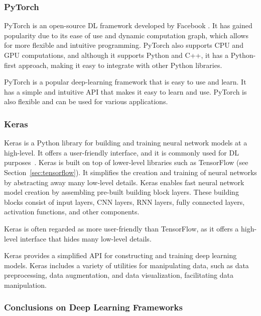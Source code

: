 \subsubsection{PyTorch} \label{sec:pytorch}

PyTorch is an open-source \ac{DL} framework developed by Facebook \cite{paszke_pytorch_2019}. It has gained popularity due to its ease of use and dynamic computation graph, which allows for more flexible and intuitive programming. PyTorch also supports \ac{CPU} and \ac{GPU} computations, and although it supports Python and C++, it has a Python-first approach, making it easy to integrate with other Python libraries.

PyTorch is a popular deep-learning framework that is easy to use and learn. It has a simple and intuitive \ac{API} that makes it easy to learn and use. PyTorch is also flexible and can be used for various applications.

\subsubsection{Keras} \label{sec:keras}

Keras is a Python library for building and training neural network models at a high-level. It offers a user-friendly interface, and it is commonly used for \ac{DL} purposes~\cite{chollet_keras_2015}. Keras is built on top of lower-level libraries such as TensorFlow (see Section~\ref{sec:tensorflow}). It simplifies the creation and training of neural networks by abstracting away many low-level details.
Keras enables fast neural network model creation by assembling pre-built building block layers. These building blocks consist of input layers, \ac{CNN} layers, \ac{RNN} layers, fully connected layers, activation functions, and other components.

Keras is often regarded as more user-friendly than TensorFlow, as it offers a high-level interface that hides many low-level details.

Keras provides a simplified \ac{API} for constructing and training deep learning models. Keras includes a variety of utilities for manipulating data, such as data preprocessing, data augmentation, and data visualization, facilitating data manipulation.

\subsubsection{Conclusions on Deep Learning Frameworks} \label{sec:dl-frameworks-conclusions}

